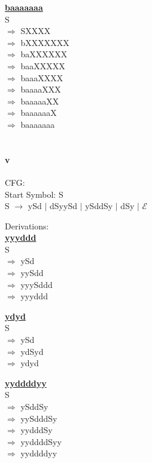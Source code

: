 \documentclass[10pt,letter]{article}
\begin{document}
\textbf{\underline{baaaaaaa}} \\
S \\
$\Rightarrow$ SXXXX \\
$\Rightarrow$ bXXXXXXX \\
$\Rightarrow$ baXXXXXX \\
$\Rightarrow$ baaXXXXX \\
$\Rightarrow$ baaaXXXX \\
$\Rightarrow$ baaaaXXX \\
$\Rightarrow$ baaaaaXX \\
$\Rightarrow$ baaaaaaX \\
$\Rightarrow$ baaaaaaa \\ \\

\paragraph{v} CFG: \\
Start Symbol: S \\
S $\rightarrow$ ySd $\mid$ dSyySd $\mid$ ySddSy $\mid$ dSy $\mid$ $\mathcal{E}$

Derivations: \\
\textbf{\underline{yyyddd}} \\
S \\
$\Rightarrow$ ySd \\
$\Rightarrow$ yySdd \\
$\Rightarrow$ yyySddd \\
$\Rightarrow$ yyyddd

\textbf{\underline{ydyd}} \\
S \\
$\Rightarrow$ ySd \\
$\Rightarrow$ ydSyd \\
$\Rightarrow$ ydyd

\textbf{\underline{yyddddyy}} \\
S \\
$\Rightarrow$ ySddSy \\
$\Rightarrow$ yySdddSy \\
$\Rightarrow$ yydddSy \\
$\Rightarrow$ yyddddSyy \\
$\Rightarrow$ yyddddyy
\end{document}
